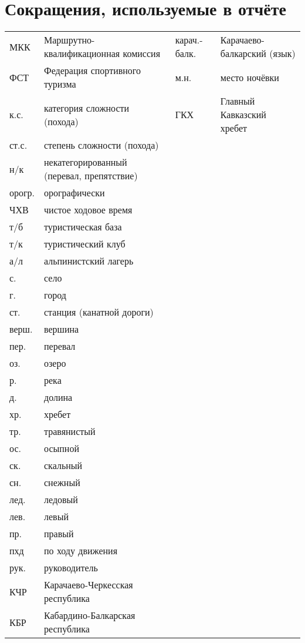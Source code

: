 \section*{Сокращения, используемые в отчёте}
\centering
\begin{tabular}{p{} p{} | p{} p{}}
	МКК                                  &   Маршрутно-квалификационная комиссия  &	карач.-балк.	&	Карачаево-балкарский (язык)	\\
	ФСТ                                &   Федерация спортивного туризма  & м.н. & место ночёвки \\
	к.с.                               &   категория сложности (похода) & ГКХ	&	Главный Кавказский хребет \\
	ст.с.							& степень сложности (похода) & & \\
	н/к                            &   некатегорированный (перевал, препятствие) & & \\
	орогр.                &   орографически & & \\
	ЧХВ                          &   чистое ходовое время  &  & \\
	т/б                         &   туристическая база & & \\
	т/к                         &   туристический клуб & & \\
	а/л                  &   альпинистский лагерь & & \\
		с. & село & & \\
	г. & город & & \\
	ст. & станция (канатной дороги) & & \\
	верш.               &   вершина & & \\
	пер.               &   перевал & & \\
	оз.             &   озеро & & \\
	р.             &   река & & \\
	д.	&	долина & &\\
	хр. &   хребет& & \\
	тр. &   травянистый & &\\
	ос. &   осыпной& & \\
	ск. &   скальный & &\\
	сн. &   снежный & &\\
	лед. &   ледовый & &\\
	лев. &   левый & &\\
	пр. &   правый & &\\
	пхд	&	по ходу движения& &	\\
	рук. &   руководитель & &\\	
	КЧР & Карачаево-Черкесская республика& &\\
	КБР & Кабардино-Балкарская республика& &\\
\end{tabular}
\clearpage